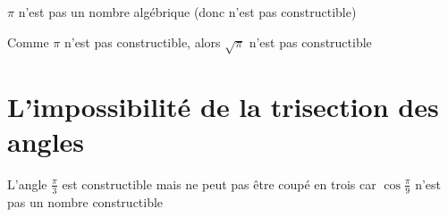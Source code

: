 \begin{frame}


\begin{center}
\end{center}

\bigskip
\pause

\begin{theoreme}
$\pi$ n'est pas un nombre algébrique (donc n'est pas constructible)
\end{theoreme}

\medskip
\pause

Comme $\pi$ n'est pas constructible, alors $\sqrt \pi$ n'est pas constructible


\end{frame}


\section{L'impossibilité de la trisection des angles}

\begin{frame}


\bigskip

\begin{center}
\end{center}
\end{frame}


\begin{frame}



\begin{center}
\end{center}

\pause
\bigskip

\begin{theoreme}
L'angle $\frac{\pi}{3}$ est constructible mais ne peut pas être coupé en trois car 
$\cos \frac \pi 9$ n'est pas un nombre constructible
\end{theoreme}
\end{frame}


